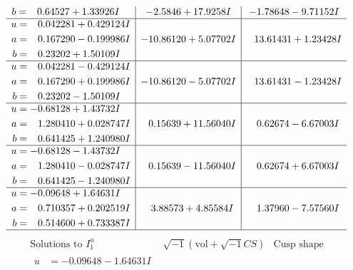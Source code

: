 \documentclass[1p]{elsarticle_modified}
\theoremstyle{definition}
\newcommand{\I}{\sqrt{-1}}
\begin{document}
$$\begin{array}{c|c|c}
\begin{aligned}
b &= \phantom{-}0.64527 + 1.33926 I\end{aligned}
 & -2.5846 + 17.9258 I & -1.78648 - 9.71152 I \\ \hline\begin{aligned}
u &= \phantom{-}0.042281 + 0.429124 I \\
a &= \phantom{-}0.167290 - 0.199986 I \\
b &= \phantom{-}0.23202 + 1.50109 I\end{aligned}
 & -10.86120 + 5.07702 I & \phantom{-}13.61431 + 1.23428 I \\ \hline\begin{aligned}
u &= \phantom{-}0.042281 - 0.429124 I \\
a &= \phantom{-}0.167290 + 0.199986 I \\
b &= \phantom{-}0.23202 - 1.50109 I\end{aligned}
 & -10.86120 - 5.07702 I & \phantom{-}13.61431 - 1.23428 I \\ \hline\begin{aligned}
u &= -0.68128 + 1.43732 I \\
a &= \phantom{-}1.280410 + 0.028747 I \\
b &= \phantom{-}0.641425 + 1.240980 I\end{aligned}
 & \phantom{-}0.15639 + 11.56040 I & \phantom{-}0.62674 - 6.67003 I \\ \hline\begin{aligned}
u &= -0.68128 - 1.43732 I \\
a &= \phantom{-}1.280410 - 0.028747 I \\
b &= \phantom{-}0.641425 - 1.240980 I\end{aligned}
 & \phantom{-}0.15639 - 11.56040 I & \phantom{-}0.62674 + 6.67003 I \\ \hline\begin{aligned}
u &= -0.09648 + 1.64631 I \\
a &= \phantom{-}0.710357 + 0.202519 I \\
b &= \phantom{-}0.514600 + 0.733387 I\end{aligned}
 & \phantom{-}3.88573 + 4.85584 I & \phantom{-}1.37960 - 7.57560 I\\
 \hline 
 \end{array}$$\newpage$$\begin{array}{c|c|c}  
\text{Solutions to }I^u_{1}& \I (\text{vol} + \sqrt{-1}CS) & \text{Cusp shape}\\
 \hline 
\begin{aligned}
u &= -0.09648 - 1.64631 I \\

\end{aligned}
\end{array}$$
\end{document}
